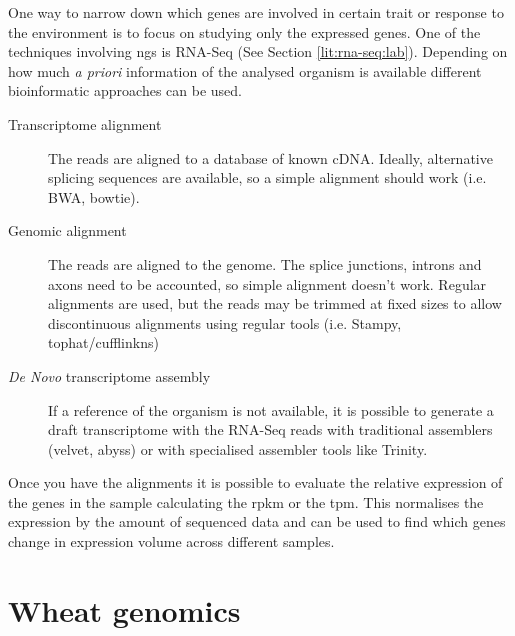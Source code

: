 One way to narrow down which genes are involved in certain trait or response to the environment is to focus on studying only the expressed genes. One of the techniques involving \gls{ngs} is RNA-Seq (See Section \ref{lit:rna-seq:lab}). %
Depending on how much \textit{a priori} information of the analysed organism is available different bioinformatic approaches can be used.
\begin{description}
\item[Transcriptome alignment] The reads are aligned to a database of known cDNA. Ideally, alternative splicing sequences are available, so a simple alignment should work (i.e. BWA, bowtie). 
\item[Genomic alignment] The reads are aligned to the genome. The splice junctions, introns and axons need to be accounted, so simple alignment doesn't work. Regular alignments are used, but the reads may be trimmed at fixed sizes to allow discontinuous alignments using regular tools (i.e. Stampy, tophat/cufflinkns)
\item[\textit{De Novo} transcriptome assembly] If a reference of the organism is not available, it is possible to generate a draft transcriptome with the RNA-Seq reads with traditional assemblers (velvet, abyss) or with specialised assembler tools like Trinity. 
\end{description}

Once you have the alignments it is possible to evaluate the relative expression of the genes in the sample calculating the \gls{rpkm} or the \gls{tpm}. This normalises the expression by the amount of sequenced data and can be used to find which genes change in expression volume across different samples.   


\section{Wheat genomics}
\label{lit:wheatResourcers}

